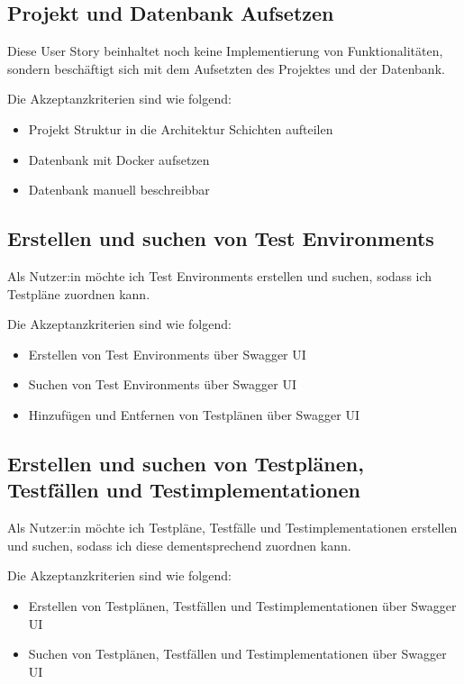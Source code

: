 \documentclass[a4paper, fontsize=11pt, parskip=half, twoside]{scrreprt}
\begin{document}
	\subsection{Projekt und Datenbank Aufsetzen}
	Diese User Story beinhaltet noch keine Implementierung von Funktionalitäten, sondern beschäftigt sich mit dem Aufsetzten des Projektes und der Datenbank.
	
	Die Akzeptanzkriterien sind wie folgend:
	\begin{itemize}
		\item Projekt Struktur in die Architektur Schichten aufteilen 
		\item Datenbank mit Docker aufsetzen
		\item Datenbank manuell beschreibbar
	\end{itemize}
	
	\subsection{Erstellen und suchen von Test Environments}
	Als Nutzer:in möchte ich Test Environments erstellen und suchen, sodass ich Testpläne zuordnen kann.
	
	Die Akzeptanzkriterien sind wie folgend:
	\begin{itemize}
		\item Erstellen von Test Environments über Swagger \ac{UI}
		\item Suchen von Test Environments über Swagger \ac{UI}
		\item Hinzufügen und Entfernen von Testplänen über Swagger \ac{UI}
	\end{itemize}

	\subsection{Erstellen und suchen von Testplänen, Testfällen und Testimplementationen}
	Als Nutzer:in möchte ich Testpläne, Testfälle und Testimplementationen erstellen und suchen, sodass ich diese dementsprechend zuordnen kann.
	
	Die Akzeptanzkriterien sind wie folgend:
	\begin{itemize}
		\item Erstellen von Testplänen, Testfällen und Testimplementationen über Swagger \ac{UI}
		\item Suchen von Testplänen, Testfällen und Testimplementationen über Swagger \ac{UI}
	\end{itemize}
	
\end{document}
